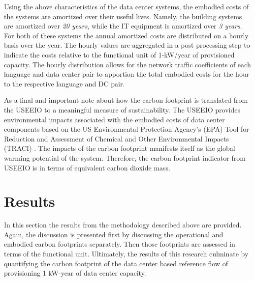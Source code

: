         
        
        
        

        Using the above characteristics of the data center systems, the embodied costs of the systems are amortized over their useful lives. Namely, the building systems are amortized over \emph{20 years}, while the IT equipment is amortized over \emph{3 years}. For both of these systems the annual amortized costs are distributed on a hourly basis over the year. The hourly values are aggregated in a post processing step to indicate the costs relative to the functional unit of 1-kW/year of provisioned capacity. The hourly distribution allows for the network traffic coefficients of each language and data center pair to apportion the total embodied costs for the hour to the respective language and DC pair.
        
        As a final and important note about how the carbon footprint is translated from the USEEIO to a meaningful measure of sustainability. The USEEIO provides environmental impacts associated with the embodied costs of data center components based on the US Environmental Protection Agency's (EPA) Tool for Reduction and Assessment of Chemical and Other Environmental Impacts (TRACI) \cite{EPA12}. The impacts of the carbon footprint manifests itself as the global warming potential of the system. Therefore, the carbon footprint indicator from USEEIO is in terms of equivalent carbon dioxide mass.

\section{Results}
    In this section the results from the methodology described above are provided. Again, the discussion is presented first by discussing the operational and embodied carbon footprints separately. Then those footprints are assessed in terms of the functional unit.  Ultimately, the results of this research culminate by quantifying the carbon footprint of the data center based reference flow of provisioning 1 kW-year of data center capacity.
    

